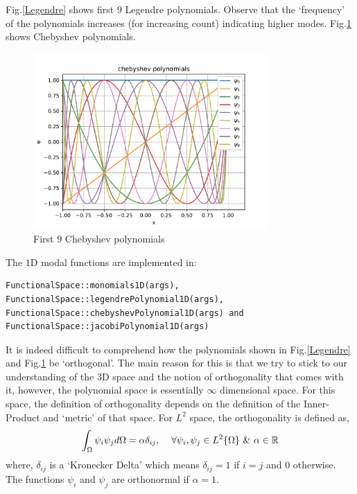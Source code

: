 Fig.\ref{Legendre} shows first $9$ Legendre polynomials. Observe that the `frequency' of the polynomials increases  (for increasing
count) indicating higher modes. Fig.\ref{Cheb} shows Chebyshev polynomials.
\begin{figure}[H]
	\begin{center}
		\includegraphics[width=0.8\textwidth]{Chebyshev.pdf}
		\caption{\label{Cheb} First $9$ Chebyshev polynomials}
	\end{center}
\end{figure}
\noindent The $1$D modal functions are implemented in:
\begin{verbatim}
FunctionalSpace::monomials1D(args),  
FunctionalSpace::legendrePolynomial1D(args), 
FunctionalSpace::chebyshevPolynomial1D(args) and 
FunctionalSpace::jacobiPolynomial1D(args)
\end{verbatim}
It is indeed difficult to comprehend how the polynomials shown in Fig.\ref{Legendre} and Fig.\ref{Cheb} be `orthogonal'.
The main reason for this is that we try to stick to our understanding of the $3$D space and the notion of 
orthogonality that comes with it, however, the polynomial space is essentially $\infty$ dimensional space. For
this space, the definition of orthogonality depends on the definition of the Inner-Product and `metric' of that space.
For $L^2$ space, the orthogonality is defined as,
\begin{equation}
	\int_{\Omega} \psi_i \psi_j d\Omega = \alpha \delta_{ij}, \hspace{4mm}\forall \psi_i, \psi_j \in L^2\{\Omega\} ~\& ~\alpha \in \mathbb{R}
\end{equation}
where, $\delta_{ij}$ is a `Kronecker Delta' which means $\delta_{ij} = 1 $ if $i=j$ and $0$ otherwise.
The functions $\psi_i$ and $\psi_j$ are orthonormal if $\alpha = 1$.


